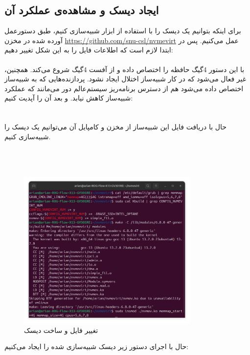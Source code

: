 \documentclass[12pt]{article}
\begin{document}
\subsection*{ایجاد دیسک  و مشاهده‌ی عملکرد آن}
برای اینکه بتوانیم یک دیسک را با استفاده از ابزار  شبیه‌سازی کنیم، طبق دستورعمل آورده شده در مخزن \url{https://github.com/snu-csl/nvmevirt} عمل می‌کنیم.
پس در ابتدا لازم است که اطلاعات فایل  را به این شکل تغییر دهیم:\\
\\
با این دستور 4گیگ حافظه را اختصاص داده و از آفست 4گیگ شروع می‌کند. همچنین،  غیر فعال می‌شود که در کار شبیه‌ساز اختلال ایجاد نشود. پردازنده‌هایی که به شبیه‌ساز اختصاص داده می‌شود هم از دسترس برنامه‌ریز سیستم‌عالم دور می‌مانند که عملکرد شبیه‌ساز کاهش نیابد.
و بعد آن را آپدیت کنیم:\\
\\
\\
حال با دریافت فایل این شبیه‌ساز از مخزن و کامپایل آن می‌توانیم یک دیسک را شبیه‌سازی کنیم.\\
\\
\\
\\
\begin{figure}[H]
    \centering
    \includegraphics[width=0.8\textwidth]{1.png}
    \caption{تغییر فایل  و ساخت دیسک}
\end{figure}
حال با اجرای دستور زیر دیسک شبیه‌سازی شده را ایجاد می‌کنیم:\\
\\
\end{document}
